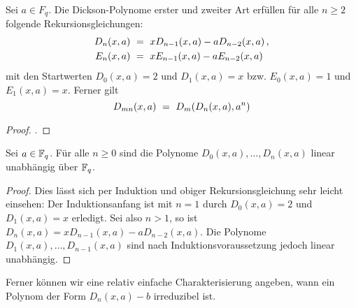 \begin{proposition}
  \label{satz:dickson_2}
  Sei $a \in F_q$. Die Dickson-Polynome erster und zweiter Art 
  erfüllen für alle $n\geq 2$ folgende Rekursionsgleichungen:
  \begin{align*}
    D_n(x,a) &\ =\  xD_{n-1}(x,a) - a D_{n-2}(x,a) \,, \\
    E_n(x,a) &\ =\  xE_{n-1}(x,a) - a E_{n-2}(x,a)
  \end{align*}
  mit den Startwerten $D_0(x,a) = 2$ und $D_1(x,a)=x$ bzw.
  $E_0(x,a) = 1$ und $E_1(x,a) = x$. Ferner gilt
  \[ D_{mn}(x,a) \ =\  D_m(D_n(x,a),a^n)\]
\end{proposition}
\begin{proof}
  \autocites[Lemma 2.3, Lemma 2.6 (i)]{lidl1993dickson}.
\end{proof}

\begin{proposition}
  \label{prop:dickson_linear_unabhangig}
  Sei $a \in \mathbb{F}_q$. Für alle $n\geq 0$ sind die Polynome
  $D_0(x,a), \ldots, D_n(x,a)$ linear unabhängig über $\mathbb{F}_q$.
\end{proposition}
\begin{proof}
  Dies lässt sich per Induktion und obiger Rekursionsgleichung
  sehr leicht einsehen: Der Induktionsanfang ist
  mit $n = 1$ durch $D_0(x,a) = 2$ und $D_1(x,a) = x$ erledigt.
  Sei also $n > 1$, so ist $D_n(x,a) = xD_{n-1}(x,a)-aD_{n-2}(x,a)$.
  Die Polynome $D_1(x,a),\ldots,D_{n-1}(x,a)$ sind nach Induktionsvoraussetzung
  jedoch linear unabhängig.
\end{proof}

Ferner können wir eine  relativ einfache Charakterisierung angeben, wann ein
Polynom der Form $D_n(x,a)-b$ irreduzibel ist.

